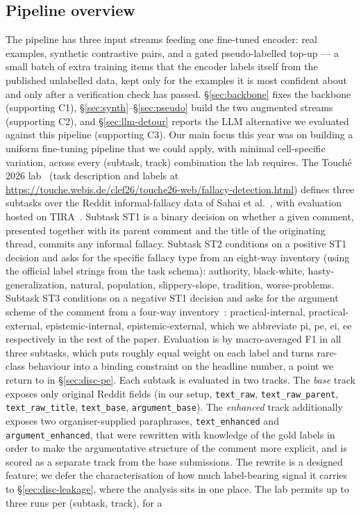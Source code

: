 \subsection{Pipeline overview}
\label{sec:pipeline}

The pipeline has three input streams feeding one fine-tuned encoder: real examples, synthetic contrastive pairs, and a gated pseudo-labelled top-up --- a small batch of extra training items that the encoder labels itself from the published unlabelled data, kept only for the examples it is most confident about and only after a verification check has passed. \S\ref{sec:backbone} fixes the backbone (supporting C1), \S\ref{sec:synth}--\S\ref{sec:pseudo} build the two augmented streams (supporting C2), and \S\ref{sec:llm-detour} reports the LLM alternative we evaluated against this pipeline (supporting C3). Our main focus this year was on building a uniform fine-tuning pipeline that we could apply, with minimal cell-specific variation, across every (subtask, track) combination the lab requires. The Touch\'{e} 2026 lab~\cite{kiesel:2026c} (task description and labels at \url{https://touche.webis.de/clef26/touche26-web/fallacy-detection.html}) defines three subtasks over the Reddit informal-fallacy data of Sahai et al.~\cite{sahai2021invisiblewall}, with evaluation hosted on TIRA~\cite{froebe:2023}. Subtask ST1 is a binary decision on whether a given comment, presented together with its parent comment and the title of the originating thread, commits any informal fallacy. Subtask ST2 conditions on a positive ST1 decision and asks for the specific fallacy type from an eight-way inventory (using the official label strings from the task schema): \textsf{authority}, \textsf{black-white}, \textsf{hasty-generalization}, \textsf{natural}, \textsf{population}, \textsf{slippery-slope}, \textsf{tradition}, \textsf{worse-problems}. Subtask ST3 conditions on a negative ST1 decision and asks for the argument scheme of the comment from a four-way inventory~\cite{walton2008schemes,macagno2022argumentation}: \textsf{practical-internal}, \textsf{practical-external}, \textsf{epistemic-internal}, \textsf{epistemic-external}, which we abbreviate \textsf{pi}, \textsf{pe}, \textsf{ei}, \textsf{ee} respectively in the rest of the paper. Evaluation is by macro-averaged F1 in all three subtasks, which puts roughly equal weight on each label and turns rare-class behaviour into a binding constraint on the headline number, a point we return to in \S\ref{sec:disc-pe}. Each subtask is evaluated in two tracks. The \emph{base} track exposes only original Reddit fields (in our setup, \texttt{text\_raw}, \texttt{text\_raw\_parent}, \texttt{text\_raw\_title}, \texttt{text\_base}, \texttt{argument\_base}). The \emph{enhanced} track additionally exposes two organiser-supplied paraphrases, \texttt{text\_enhanced} and \texttt{argument\_enhanced}, that were rewritten with knowledge of the gold labels in order to make the argumentative structure of the comment more explicit, and is scored as a separate track from the base submissions. The rewrite is a designed feature; we defer the characterisation of how much label-bearing signal it carries to \S\ref{sec:disc-leakage}, where the analysis sits in one place. The lab permits up to three runs per (subtask, track), for a 